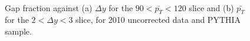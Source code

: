 \begin{figure}
\centering
\mbox{
              \quad
              \quad
                              }
\caption[Comparison of gap fraction between data and PYTHIA sample for $\Delta y$]{Gap fraction against (a) $\Delta y$ for the $90<\bar{p_T}<120$ slice and (b) $\bar{p_T}$ for the $2 < \Delta y <3$ slice, for 2010 uncorrected data and PYTHIA sample.\label{Uncorr_GF}}
\end{figure}


